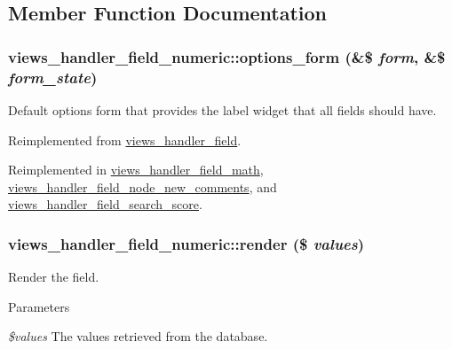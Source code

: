 \subsection{Member Function Documentation}
\hypertarget{classviews__handler__field__numeric_ae6f81d1896ece64e9450ebc2d60da2fd}{
\subsubsection[{options\_\-form}]{\setlength{\rightskip}{0pt plus 5cm}views\_\-handler\_\-field\_\-numeric::options\_\-form (\&\$ {\em form}, \/  \&\$ {\em form\_\-state})}}
\label{classviews__handler__field__numeric_ae6f81d1896ece64e9450ebc2d60da2fd}
Default options form that provides the label widget that all fields should have. 

Reimplemented from \hyperlink{classviews__handler__field_a0435d161922b7b4b84f02a2e79bb947a}{views\_\-handler\_\-field}.

Reimplemented in \hyperlink{classviews__handler__field__math_a0a1d90a724d24fc1ae096413749aba05}{views\_\-handler\_\-field\_\-math}, \hyperlink{classviews__handler__field__node__new__comments_a2a209d3acbaa47e781df96bc0ca85156}{views\_\-handler\_\-field\_\-node\_\-new\_\-comments}, and \hyperlink{classviews__handler__field__search__score_ad3bc7dfcc4859869b75b371c33380abb}{views\_\-handler\_\-field\_\-search\_\-score}.\hypertarget{classviews__handler__field__numeric_a9c76aeef951c45385fd91a22e5e656aa}{
\subsubsection[{render}]{\setlength{\rightskip}{0pt plus 5cm}views\_\-handler\_\-field\_\-numeric::render (\$ {\em values})}}
\label{classviews__handler__field__numeric_a9c76aeef951c45385fd91a22e5e656aa}
Render the field.


\begin{DoxyParams}{Parameters}
\item[{\em \$values}]The values retrieved from the database. \end{DoxyParams}


